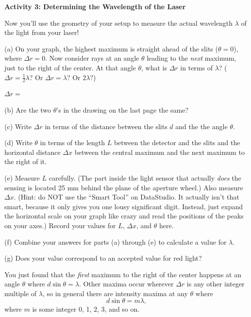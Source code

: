 \pagebreak[2]
\textbf{Activity 3: Determining the Wavelength of the Laser }

Now you'll use the geometry of your setup to measure the actual wavelength $\lambda$ of the light from your laser!

(a) On your graph, the highest maximum is straight ahead of the slits ($\theta=0$), where $\Delta r=0$.  Now consider rays at an angle $\theta$ leading to the \textit{next} maximum, just to the right of the center.  At that angle $\theta$, what is $\Delta r$ in terms of $\lambda$?   ($\Delta r=\frac{1}{2}\lambda$?  Or $\Delta r = \lambda$?  Or $2\lambda$?) 

\vspace{0.1in}
\hspace{0.8in}$\Delta r=$
\vspace{0.1in}

(b) Are the two $\theta$'s in the drawing on the last page the same?
\answerspace{0.2in}

(c) Write $\Delta r$ in terms of the distance between the slits $d$ and the the angle $\theta$.
\answerspace{0.4in}

(d) Write $\theta$ in terms of the length $L$ between the detector and the slits and the horizontal distance $\Delta x$ between the central maximum and the next maximum to the right of it.
\answerspace{0.4in}

(e) Measure $L$ carefully.  (The part inside the light sensor that actually \textit{does} the sensing is located 25 mm behind the plane of the aperture wheel.)  
Also measure $\Delta x$.  (Hint: do NOT use the ``Smart Tool'' on DataStudio.  It actually isn't that smart, because it only gives you one lousy significant digit.  Instead, just expand the horizontal scale on your graph like crazy and read the positions of the peaks on your axes.)  Record your values for $L$, $\Delta x$, and $\theta$ here.

\answerspace{0.8in}

(f) Combine your answers for parts (a) through (e) to calculate a value for $\lambda$.  
\answerspace{1in}

(g) Does your value correspond to an accepted value for red light?
\answerspace{0.3in}

You just found that the \textit{first} maximum to the right of the center happens at an angle $\theta$ where $d \sin \theta = \lambda$.  Other maxima occur wherever $\Delta r$ is any other integer multiple of $\lambda$, so in general there are intensity maxima at any $\theta$ where
\begin{displaymath}
d \sin \theta = m \lambda,
\end{displaymath}
where $m$ is some integer 0, 1, 2, 3, and so on.  

